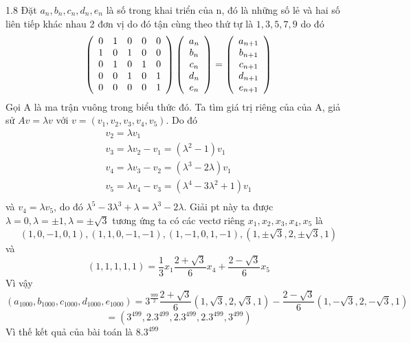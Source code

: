 \begin{Answer}{1.8}
Đặt $a_n ,b_n ,c_n ,d_n ,e_n $ là số trong khai triển của n, đó là những số lẻ và hai số liên tiếp khác nhau 2 đơn vị do đó tận cùng theo thứ tự là $1,3,5,7,9$ do đó
\[
\left( {\begin{array}{*{20}c}
   0 & 1 & 0 & 0 & 0 \\
   1 & 0 & 1 & 0 &0 \\
   0 & 1 & 0 & 1 &0  \\
   0 & 0 & 1 & 0 &1 \\
   0 & 0 & 0 & 0 &1 \\
\end{array}} \right)\left( {\begin{array}{*{20}c}
   {a_n }  \\
   {b_n }  \\
   {c_n }  \\
   {d_n }  \\
   {e_n }  \\
\end{array}} \right) = \left( {\begin{array}{*{20}c}
   {a_{n + 1} }  \\
   {b_{n + 1} }  \\
   {c_{n + 1} }  \\
   {d_{n + 1} }  \\
   {e_{n + 1} }  \\
\end{array}} \right)
\]
Gọi A là ma trận vuông trong biểu thức đó. Ta tìm giá trị riêng của của A, giả sử $Av = \lambda v$ với $v = \left( {v_1 ,v_2 ,v_3 ,v_4 ,v_5 } \right)$. Do đó
\[
\begin{array}{l}
 v_2  = \lambda v_1  \\
 v_3  = \lambda v_2  - v_1  = \left( {\lambda ^2  - 1} \right)v_1  \\
 v_4  = \lambda v_3  - v_2  = \left( {\lambda ^3  - 2\lambda } \right)v_1  \\
 v_5  = \lambda v_4  - v_3  = \left( {\lambda ^4  - 3\lambda ^2  + 1} \right)v_1  \\
 \end{array}
\]
và $v_4  = \lambda v_5 $, do đó $\lambda ^5  - 3\lambda ^3  + \lambda  = \lambda ^3  - 2\lambda $. Giải pt này ta được $\lambda  = 0,\lambda  =  \pm 1,\lambda  =  \pm \sqrt 3 $ tương ứng ta có các vectơ riêng $x_1 ,x_2 ,x_3 ,x_4 ,x_5 $ là
\[\left( {1,0, - 1,0,1} \right),\left( {1,1,0, - 1, - 1} \right),\left( {1, - 1,0,1, - 1} \right),\left( {1, \pm \sqrt 3 ,2, \pm \sqrt 3 ,1} \right)\]
và \[\left( {1,1,1,1,1} \right) = \frac{1}{3}x_1 \frac{{2 + \sqrt 3 }}{6}x_4  + \frac{{2 - \sqrt 3 }}{6}x_5 \]
Vì vậy \[\left( {a_{1000} ,b_{1000} ,c_{1000} ,d_{1000} ,e_{1000} } \right) = 3^{\frac{{999}}{2}} \frac{{2 + \sqrt 3 }}{6}\left( {1,\sqrt 3 ,2,\sqrt 3 ,1} \right) - \frac{{2 - \sqrt 3 }}{6}\left( {1, - \sqrt 3 ,2, - \sqrt 3 ,1} \right)\]
\[=\left( {3^{499} ,2.3^{499} ,2.3^{499} ,2.3^{499} ,3^{499} } \right)\]
Vì thế kết quả của bài toán là $8.3^{499} $
\end{Answer}

